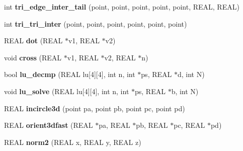 \begin{DoxyCompactItemize}
\item 
\hypertarget{classtetgenmesh_aa3f520658457aef3298ec00832c5e960}{int {\bfseries tri\-\_\-edge\-\_\-inter\-\_\-tail} (point, point, point, point, point, R\-E\-A\-L, R\-E\-A\-L)}\label{classtetgenmesh_aa3f520658457aef3298ec00832c5e960}

\item 
\hypertarget{classtetgenmesh_a8d7e2af757a3a301a22e46580e037f7c}{int {\bfseries tri\-\_\-tri\-\_\-inter} (point, point, point, point, point, point)}\label{classtetgenmesh_a8d7e2af757a3a301a22e46580e037f7c}

\item 
\hypertarget{classtetgenmesh_afa0906703b590597155547336c360004}{R\-E\-A\-L {\bfseries dot} (R\-E\-A\-L $\ast$v1, R\-E\-A\-L $\ast$v2)}\label{classtetgenmesh_afa0906703b590597155547336c360004}

\item 
\hypertarget{classtetgenmesh_a9b5ff4d3e2452044830fbd47d2f70cbd}{void {\bfseries cross} (R\-E\-A\-L $\ast$v1, R\-E\-A\-L $\ast$v2, R\-E\-A\-L $\ast$n)}\label{classtetgenmesh_a9b5ff4d3e2452044830fbd47d2f70cbd}

\item 
\hypertarget{classtetgenmesh_abc03dce4c75ad6ba7086269b1a71fd8b}{bool {\bfseries lu\-\_\-decmp} (R\-E\-A\-L lu\mbox{[}4\mbox{]}\mbox{[}4\mbox{]}, int n, int $\ast$ps, R\-E\-A\-L $\ast$d, int N)}\label{classtetgenmesh_abc03dce4c75ad6ba7086269b1a71fd8b}

\item 
\hypertarget{classtetgenmesh_a6a19601c86a49eed0d2273f1d3b69826}{void {\bfseries lu\-\_\-solve} (R\-E\-A\-L lu\mbox{[}4\mbox{]}\mbox{[}4\mbox{]}, int n, int $\ast$ps, R\-E\-A\-L $\ast$b, int N)}\label{classtetgenmesh_a6a19601c86a49eed0d2273f1d3b69826}

\item 
\hypertarget{classtetgenmesh_adeb163031003774cc674a4cf88de1a74}{R\-E\-A\-L {\bfseries incircle3d} (point pa, point pb, point pc, point pd)}\label{classtetgenmesh_adeb163031003774cc674a4cf88de1a74}

\item 
\hypertarget{classtetgenmesh_aef205894579ac572d70018a484e81c84}{R\-E\-A\-L {\bfseries orient3dfast} (R\-E\-A\-L $\ast$pa, R\-E\-A\-L $\ast$pb, R\-E\-A\-L $\ast$pc, R\-E\-A\-L $\ast$pd)}\label{classtetgenmesh_aef205894579ac572d70018a484e81c84}

\item 
\hypertarget{classtetgenmesh_a5465dba34abe5cec04987f0a767c7ca9}{R\-E\-A\-L {\bfseries norm2} (R\-E\-A\-L x, R\-E\-A\-L y, R\-E\-A\-L z)}\label{classtetgenmesh_a5465dba34abe5cec04987f0a767c7ca9}


\end{DoxyCompactItemize}
